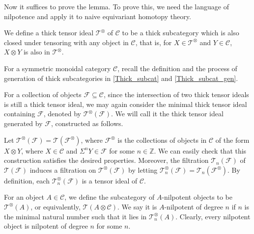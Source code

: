 	Now it suffices to prove the lemma. To prove this, we need the language of nilpotence and apply it to naive equivariant homotopy theory. 

	\begin{defn}\label{Thick_tensor_ideal}
		We define a thick tensor ideal $\mathcal{T}^\otimes$ of $\mathcal{C}$ to be a thick subcategory which is also closed under tensoring with any object in $\mathcal{C}$, that is, for $X\in\mathcal{T}^\otimes$ and $Y\in\mathcal{C}$, $X\otimes Y$ is also in $\mathcal{T}^\otimes$. 
	\end{defn}

	\begin{const}\label{Thick_tensor_ideal_gen}
		For a symmetric monoidal category $\mathcal{C}$, recall the definition and the process of generation of thick subcategories in \cref{Thick_subcat} and \cref{Thick_subcat_gen}. 

		For a collection of objects $\mathcal{F}\subseteq\mathcal{C}$, since the intersection of two thick tensor ideals is still a thick tensor ideal, we may again consider the minimal thick tensor ideal containing $\mathcal{F}$, denoted by $\mathcal{T}^\otimes(\mathcal{F})$. We will call it the thick tensor ideal generated by $\mathcal{F}$, constructed as follows. 

		Let $\mathcal{T}^\otimes(\mathcal{F})=\mathcal{T}(\mathcal{F}^\otimes)$, where $\mathcal{F}^\otimes$ is the collections of objects in $\mathcal{C}$ of the form $X\otimes Y$, where $X\in\mathcal{C}$ and $\Sigma^nY\in\mathcal{F}$ for some $n\in\mathbb{Z}$. We can easily check that this construction satisfies the desired properties. Moreover, the filtration $\mathcal{T}_n(\mathcal{F})$ of $\mathcal{T}(\mathcal{F})$ induces a filtration on $\mathcal{T}^\otimes(\mathcal{F})$ by letting $\mathcal{T}^\otimes_n(\mathcal{F})=\mathcal{T}_n(\mathcal{F}^\otimes)$. By definition, each $\mathcal{T}^\otimes_n(\mathcal{F})$ is a tensor ideal of $\mathcal{C}$. 
	\end{const}

	\begin{defn}\label{Nilpotent_objects}
		For an object $A\in\mathcal{C}$, we define the subcategory of $A$-nilpotent objects to be $\mathcal{T}^\otimes(A)$, or equivalently, $\mathcal{T}(A\otimes\mathcal{C})$. We say it is $A$-nilpotent of degree $n$ if $n$ is the minimal natural number such that it lies in $\mathcal{T}_n^\otimes(A)$. Clearly, every nilpotent object is nilpotent of degree $n$ for some $n$. 
	\end{defn}

